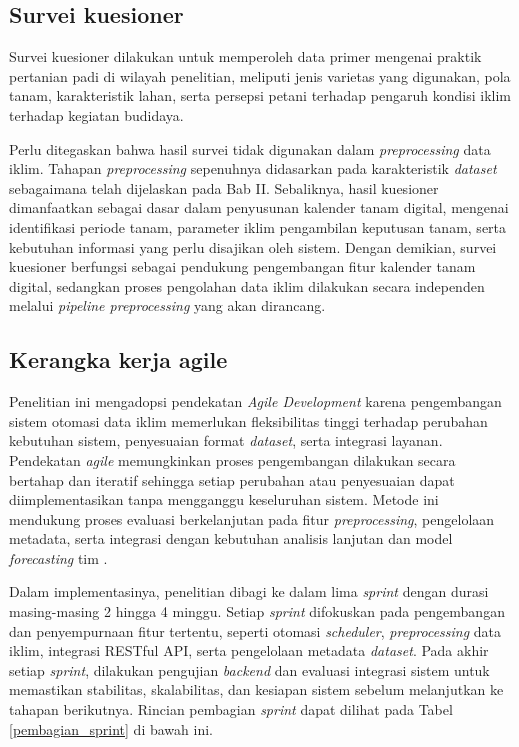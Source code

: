 \subsection{Survei kuesioner}
Survei kuesioner dilakukan untuk memperoleh data primer mengenai praktik pertanian padi di wilayah penelitian, meliputi jenis varietas yang digunakan, pola tanam, karakteristik lahan, serta persepsi petani terhadap pengaruh kondisi iklim terhadap kegiatan budidaya.

Perlu ditegaskan bahwa hasil survei tidak digunakan dalam \textit{preprocessing} data iklim. Tahapan \textit{preprocessing} sepenuhnya didasarkan pada karakteristik \textit{dataset} sebagaimana telah dijelaskan pada Bab II. Sebaliknya, hasil kuesioner dimanfaatkan sebagai dasar dalam penyusunan kalender tanam digital, mengenai identifikasi periode tanam, parameter iklim pengambilan keputusan tanam, serta kebutuhan informasi yang perlu disajikan oleh sistem. Dengan demikian, survei kuesioner berfungsi sebagai pendukung pengembangan fitur kalender tanam digital, sedangkan proses pengolahan data iklim dilakukan secara independen melalui \textit{pipeline preprocessing} yang akan dirancang.

\subsection{Kerangka kerja agile}
Penelitian ini mengadopsi pendekatan \textit{Agile Development} karena pengembangan sistem otomasi data iklim memerlukan fleksibilitas tinggi terhadap perubahan kebutuhan sistem, penyesuaian format \textit{dataset}, serta integrasi layanan. Pendekatan \textit{agile} memungkinkan proses pengembangan dilakukan secara bertahap dan iteratif sehingga setiap perubahan atau penyesuaian dapat diimplementasikan tanpa mengganggu keseluruhan sistem. Metode ini mendukung proses evaluasi berkelanjutan pada fitur \textit{preprocessing}, pengelolaan metadata, serta integrasi dengan kebutuhan analisis lanjutan dan model \textit{forecasting} tim \citep{jovanovic2020}.

Dalam implementasinya, penelitian dibagi ke dalam lima \textit{sprint} dengan durasi masing-masing 2 hingga 4 minggu. Setiap \textit{sprint} difokuskan pada pengembangan dan penyempurnaan fitur tertentu, seperti otomasi \textit{scheduler}, \textit{preprocessing} data iklim, integrasi RESTful API, serta pengelolaan metadata \textit{dataset}. Pada akhir setiap \textit{sprint}, dilakukan pengujian \textit{backend} dan evaluasi integrasi sistem untuk memastikan stabilitas, skalabilitas, dan kesiapan sistem sebelum melanjutkan ke tahapan berikutnya. Rincian pembagian \textit{sprint} dapat dilihat pada Tabel \ref{pembagian_sprint} di bawah ini.

